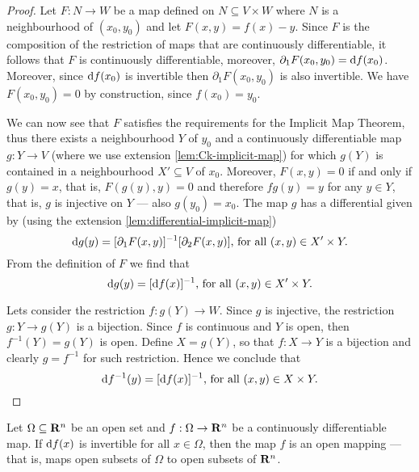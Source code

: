 \begin{proof}
    Let \(F: N \to W\) be a map defined on \(N \subseteq V \times W\) where \(N\) is a
    neighbourhood of \((x_0, y_0)\) and let \(F(x, y) = f(x) - y\). Since \(F\) is
    the composition of the restriction of maps that are continuously
    differentiable, it follows that \(F\) is continuously differentiable, moreover,
    \(\partial_1F(x_0, y_0) = \mathrm{d} f(x_0)\).  Moreover, since \(\mathrm{d} f(x_0)\) is
    invertible then \(\partial_1F(x_0, y_0)\) is also invertible. We have \(F(x_0, y_0) =
    0\) by construction, since \(f(x_{0}) = y_0\).

    We can now see that \(F\) satisfies the requirements for the Implicit Map
    Theorem, thus there exists a neighbourhood \(Y\) of \(y_0\) and a
    continuously differentiable map \(g: Y \to V\) (where we use extension
    \cref{lem:Ck-implicit-map}) for which \(g(Y)\) is contained in a
    neighbourhood \(X' \subseteq V\) of \(x_{0}\). Moreover, \(F(x, y) = 0\) if and only
    if \(g(y) = x\), that is, \(F(g(y), y) = 0\) and therefore \(f g(y) = y\) for
    any \(y \in Y\), that is, \(g\) is injective on \(Y\) --- also \(g(y_0) =
    x_0\). The map \(g\) has a differential given by (using the extension
    \cref{lem:differential-implicit-map})
    \[
        \mathrm{d} g(y) = [\partial_{1} F(x, y)]^{-1} [\partial_2 F(x, y)] \text{, for all } (x, y) \in
        X' \times Y.
    \]
    From the definition of \(F\) we find that
    \[
        \mathrm{d} g(y) = [\mathrm{d} f(x)]^{-1} \text{, for all } (x, y) \in X' \times Y.
    \]

    Lets consider the restriction \(f: g(Y) \to W\). Since \(g\) is injective, the
    restriction \(g: Y \to g(Y)\) is a bijection. Since \(f\) is continuous and
    \(Y\) is open, then \(f^{-1}(Y) = g(Y)\) is open. Define \(X = g(Y)\), so that
    \(f: X \to Y\) is a bijection and clearly \(g = f^{-1}\) for such
    restriction. Hence we conclude that
    \[
        \mathrm{d} f^{-1}(y) = [\mathrm{d} f(x)]^{-1} \text{, for all } (x, y) \in X \times Y.
    \]
\end{proof}

\begin{theorem}
    \label{thm:open-map-theorem}
    Let \(\Omega \subseteq \mathbf{R}^n\) be an open set and \(f: \Omega \to \mathbf{R}^{n}\) be a continuously
    differentiable map. If \(\mathrm{d} f(x)\) is invertible for all \(x \in \Omega\), then
    the map \(f\) is an open mapping --- that is, maps open subsets of \(\Omega\) to
    open subsets of \(\mathbf{R}^n\).
\end{theorem}


